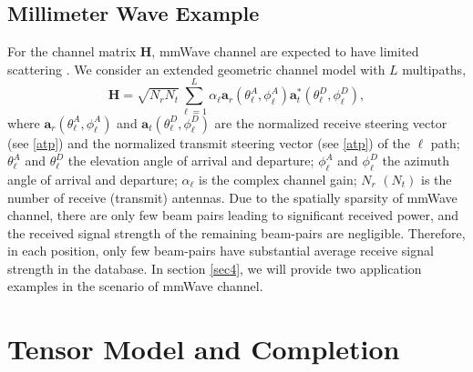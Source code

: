 \documentclass[12pt, draftcls, onecolumn]{IEEEtran}
\theoremstyle{plain}
\theoremstyle{definition}
\theoremstyle{remark}
\newcommand{\nt}[1]{\textcolor{red}{\textbf{[#1]}}}
\begin{document}



\subsection{Millimeter Wave Example}
For the channel matrix $\mathbf{H}$, mmWave channel are expected to have limited scattering \cite{6387266}. We consider an extended geometric channel model \cite{7400949} with $L$ multipaths,
$$\mathbf{H}=\sqrt{N_rN_t}\sum^{L}_{\ell=1}{\alpha_\ell}\mathbf{a}_r(\theta_{\ell}^{A},\phi_{\ell}^{A})\mathbf{a}_t^{*}(\theta_{\ell}^{D},\phi_{\ell}^{D}),$$
where $\mathbf{a}_r(\theta_{\ell}^{A},\phi_{\ell}^{A})$ and $\mathbf{a}_t(\theta_{\ell}^{D},\phi_{\ell}^{D})$ are the normalized receive steering vector (see \eqref{atp}) and the normalized transmit steering vector (see \eqref{atp}) of the $\ell$ path;
$\theta_\ell^A$ and $\theta_\ell^D$ the elevation angle of arrival and departure;
$\phi_\ell^A$ and $\phi_\ell^D$ the azimuth angle of arrival and departure;
$\alpha_\ell$ is the complex channel gain; $N_r$ $(N_t)$ is the number of receive (transmit) antennas. 
Due to the spatially sparsity of mmWave channel, there are only few beam pairs leading to significant received power, and the received signal strength of the remaining beam-pairs are negligible.
Therefore, in each position, only few beam-pairs have substantial average receive signal strength in the database.
In section \ref{sec4}, we will provide two application examples in the scenario of mmWave channel.



\section{Tensor Model and Completion }
\end{document}
